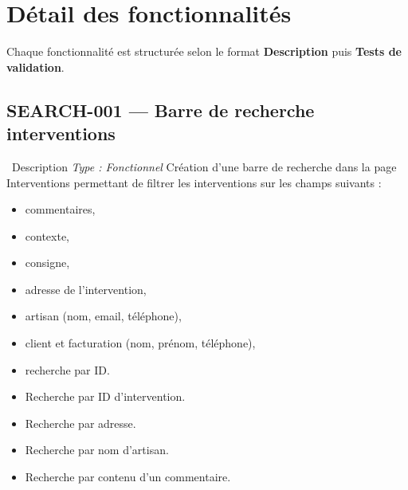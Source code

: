 \documentclass[12pt,a4paper]{article}
\newcommand{\checkmark}{\ding{51}}
\begin{document}
\section{Détail des fonctionnalités}

Chaque fonctionnalité est structurée selon le format \textbf{Description} puis \textbf{Tests de validation}.

\subsection{SEARCH-001 — Barre de recherche interventions}
\label{subsec:search-001}

\begin{featurebox}{\faSearch\ Description \hfill \textit{Type : Fonctionnel}}
Création d'une barre de recherche dans la page Interventions permettant de filtrer les interventions sur les champs suivants :
\begin{itemize}[leftmargin=2em, itemsep=0pt]
    \item commentaires,
    \item contexte,
    \item consigne,
    \item adresse de l'intervention,
    \item artisan (nom, email, téléphone),
    \item client et facturation (nom, prénom, téléphone),
    \item recherche par ID.
\end{itemize}
\end{featurebox}

\begin{testbox}
\begin{itemize}[leftmargin=2em, itemsep=2pt]
    \item[\checkmark] Recherche par ID d'intervention.
    \item[\checkmark] Recherche par adresse.
    \item[\checkmark] Recherche par nom d'artisan.
    \item[\checkmark] Recherche par contenu d'un commentaire.
\end{itemize}
\end{testbox}

\end{document}
